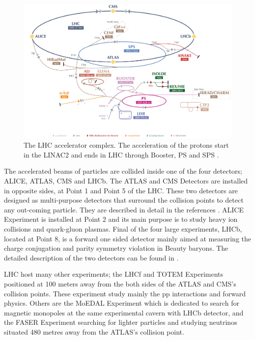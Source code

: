 \begin{figure}[ht]
	\centering
	\includegraphics[width=\textwidth]{MSc_Thesis/fig/LHCacc.png}
	\vspace{2mm}
	\caption[The LHC accelerator complex. The acceleration of the protons start in the LINAC2 and ends in LHC through Booster, PS and SPS.]
	{The LHC accelerator complex. The acceleration of the protons start in the LINAC2 and ends in LHC through Booster, PS and SPS \cite{Mobs:2197559}.}
	\label{LHCacc}
\end{figure}

The accelerated beams of particles are collided inside one of the four detectors; ALICE, ATLAS, CMS and LHCb. The ATLAS and CMS Detectors are installed in opposite sides, at Point 1 and Point 5 of the LHC. These two detectors are designed as multi-purpose detectors that surround the collision points to detect any out-coming particle. They are described in detail in the references \cite{ATLAS2008, CMS2008}. ALICE Experiment is installed at Point 2 and its main purpose is to study heavy ion collisions and quark-gluon plasmas. Final of the four large experiments, LHCb, located at Point 8, is a forward one sided detector mainly aimed at measuring the charge conjugation and parity symmetry violation in Beauty baryons. The detailed description of the two detectors can be found in \cite{ALICE2008, LHCb2008}.

LHC host many other experiments; the LHCf \cite{LHCF2006} and TOTEM \cite{TOTEM2004} Experiments positioned at 100 meters away from the both sides of the ATLAS and CMS's collision points. These experiment study mainly the pp interactions and forward physics. Others are the MoEDAL\cite{moedal} Experiment which is dedicated to search for magnetic monopoles at the same experimental cavern with LHCb detector, and the FASER Experiment searching for lighter particles and studying neutrinos situated 480 metres away from the ATLAS's collision point.

